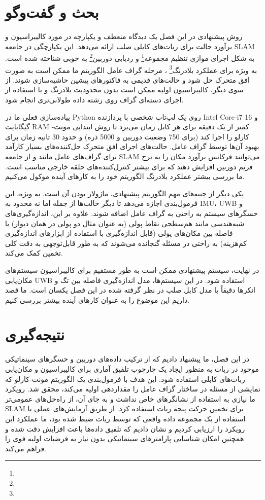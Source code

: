 \section{بحث و گفت‌وگو}
روش پیشنهادی در این فصل یک دیدگاه منعطف و یکپارچه در مورد کالیبراسیون و برآورد حالت برای ربات‌های کابلی صلب ارائه می‌دهد. این یکپارچگی در جامعه SLAM به شکل اجرای موازی تنظیم مجموعه\footnote{}
 و ردیابی دوربین\footnote{}
 به خوبی شناخته شده است. به ویژه برای عملکرد بلادرنگ\footnote{}
 ، مرحله گراف عامل الگوریتم ما ممکن است به صورت افق متحرک حل شود و حالت‌های قدیمی به فاکتورهای پیشین حاشیه‌سازی شوند. از سوی دیگر، کالیبراسیون اولیه ممکن است بدون محدودیت بلادرنگ و با استفاده از اجرای دسته‌ای گراف روی رشته داده طولانی‌تری انجام شود.

پیاده‌سازی فعلی ما در Python روی یک لپ‌تاپ شخصی با پردازنده Intel Core-i7 و 16 گیگابایت RAM کمتر از یک دقیقه برای هر کابل زمان می‌برد تا روش ابتدایی مونت-کارلو را اجرا کند (برای 750 وضعیت دوربین و 5000 ذره) و حدود 30 ثانیه زمان برای بهبود آن‌ها توسط گراف عامل. حالت‌های اجرای افق متحرک حل‌کننده‌های بسیار کارآمد برای گراف‌های عامل مانند 
\cite{dellaert2012factor} و \cite{martiros2022symforce}
 از جامعه SLAM می‌توانند فرکانس برآورد مکان را به نرخ فریم دوربین افزایش دهند که برای بیشتر کنترل‌کننده‌های حلقه خارجی مناسب است. ما بررسی بیشتر عملکرد بلادرنگ الگوریتم خود را به کارهای آینده موکول می‌کنیم.

یکی دیگر از جنبه‌های مهم الگوریتم پیشنهادی، ماژولار بودن آن است. به ویژه، این فرمول‌بندی اجازه می‌دهد تا دیگر حالت‌ها از جمله اما نه محدود به IMU، UWB و حسگرهای سیستم به راحتی به گراف عامل اضافه شوند. علاوه بر این، اندازه‌گیری‌های شبه‌هندسی مانند هم‌سطحی نقاط پولی (به عنوان مثال دو پولی در همان دیوار) یا فاصله بین مکان‌های پولی (قابل اندازه‌گیری با استفاده از ابزارهای اندازه‌گیری کم‌هزینه) به راحتی در مسئله گنجانده می‌شوند که به طور قابل‌توجهی به دقت کلی تخمین کمک می‌کند.

در نهایت، سیستم پیشنهادی ممکن است به طور مستقیم برای کالیبراسیون سیستم‌های مکان‌یابی UWB استفاده شود. در این سیستم‌ها، مدل اندازه‌گیری فاصله بین تگ و انکرها دقیقاً با مدل کابل صلب در نظر گرفته شده در این فصل یکسان است. ما قصد داریم این موضوع را به عنوان کارهای آینده بیشتر بررسی کنیم.


\section{نتیجه‌گیری}

در این فصل، ما پیشنهاد دادیم که از ترکیب داده‌های دوربین و حسگرهای سینماتیکی موجود در ربات به منظور ایجاد یک چارچوب تلفیق آماری برای کالیبراسیون و مکان‌یابی ربات‌های کابلی استفاده شود. این هدف با فرمول‌بندی یک الگوریتم مونت-کارلو که نمایشی از مسئله در ساختار گراف عامل را مقداردهی اولیه می‌کند، محقق شد. رویکرد ما نیازی به استفاده از نشانگرهای خاص نداشت و به جای آن، از راه‌حل‌های عمومی‌تر SLAM برای تخمین حرکت پنجه ربات استفاده کرد. از طریق آزمایش‌های عملی با استفاده از یک مجموعه داده واقعی که توسط ربات  ضبط شده بود، ما عملکرد این رویکرد را ارزیابی کردیم و نشان دادیم که تلفیق داده‌ها باعث افزایش دقت شده و همچنین امکان شناسایی پارامترهای سینماتیکی بدون نیاز به فرضیات اولیه قوی را فراهم می‌کند. 
